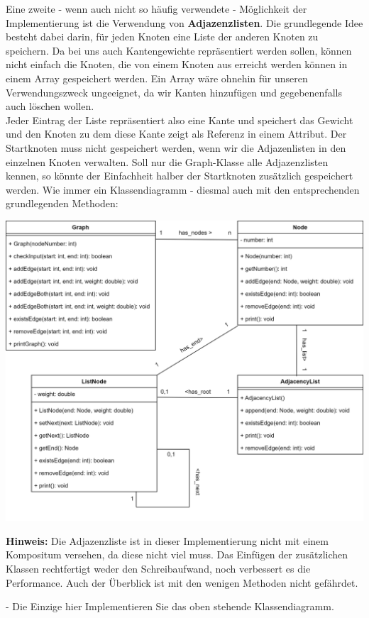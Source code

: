\documentclass{article}
\begin{document}
Eine zweite - wenn auch nicht so häufig verwendete - Möglichkeit der Implementierung ist die Verwendung von \textbf{Adjazenzlisten}. Die grundlegende Idee besteht dabei darin, für jeden Knoten eine Liste der anderen Knoten zu speichern. Da bei uns auch Kantengewichte repräsentiert werden sollen, können nicht einfach die Knoten, die von einem Knoten aus erreicht werden können in einem Array gespeichert werden. Ein Array wäre ohnehin für unseren Verwendungszweck ungeeignet, da wir Kanten hinzufügen und gegebenenfalls auch löschen wollen. \\
Jeder Eintrag der Liste repräsentiert also eine Kante und speichert das Gewicht und den Knoten zu dem diese Kante zeigt als Referenz in einem Attribut. Der Startknoten muss nicht gespeichert werden, wenn wir die Adjazenlisten in den einzelnen Knoten verwalten. Soll nur die Graph-Klasse alle Adjazenzlisten kennen, so könnte der Einfachheit halber der Startknoten zusätzlich gespeichert werden. Wie immer ein Klassendiagramm - diesmal auch mit den entsprechenden grundlegenden Methoden: 
\begin{center}
    \includegraphics[scale=0.2]{../media/graphs_lists.png}
\end{center}
\textbf{Hinweis:} Die Adjazenzliste ist in dieser Implementierung nicht mit einem Kompositum versehen, da diese nicht viel  muss. Das Einfügen der zusätzlichen Klassen rechtfertigt weder den Schreibaufwand, noch verbessert es die Performance. Auch der Überblick ist mit den wenigen Methoden nicht gefährdet. 
\begin{task}{- Die Einzige hier}
    Implementieren Sie das oben stehende Klassendiagramm.
\end{task}
\end{document}
